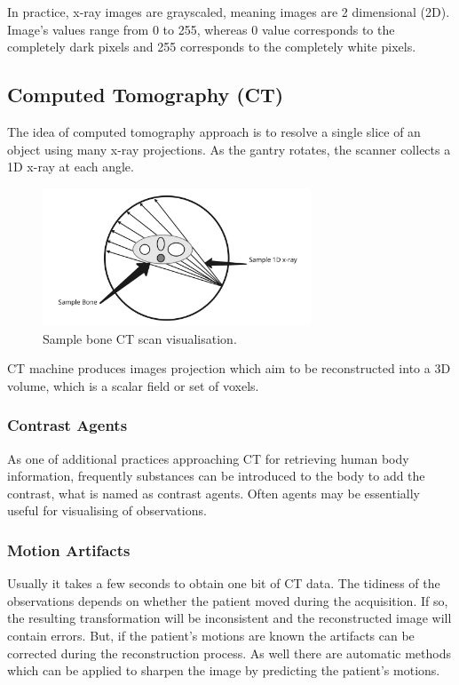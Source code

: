 In practice, x-ray images are grayscaled, meaning images are 2 dimensional (2D). Image's values range from 0 to 255, whereas 0 value corresponds to the completely dark pixels and 255 corresponds to the completely white pixels.


\subsection{Computed Tomography (CT)}
The idea of computed tomography approach is to resolve a single slice of an object using many x-ray projections. As the gantry rotates, the scanner collects a 1D x-ray at each angle.

\begin{figure}[h]
    \centering \includegraphics[width=8cm]{images/ct-scan-sample.jpeg}
    \caption {Sample bone CT scan visualisation.}
\end{figure}

CT machine produces images projection which aim to be reconstructed into a 3D volume, which is a scalar field or set of voxels. 

\subsubsection{Contrast Agents}
As one of additional practices approaching CT for retrieving human body information, frequently substances can be introduced to the body to add the contrast, what is named as contrast agents. Often agents may be essentially useful for visualising of observations.          

\subsubsection{Motion Artifacts}
Usually it takes a few seconds to obtain one bit of CT data. The tidiness of the observations depends on whether the patient moved during the acquisition. If so, the resulting transformation will be inconsistent and the reconstructed image will contain errors. But, if the patient's motions are known the artifacts can be corrected during the reconstruction process. As well there are automatic methods which can be applied to sharpen the image by predicting the patient's motions.

